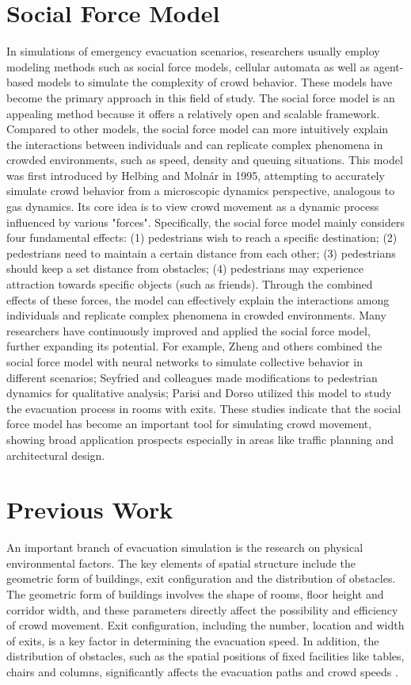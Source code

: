 \section{Social Force Model}
In simulations of emergency evacuation scenarios, researchers usually employ modeling methods such as social force models, cellular automata as well as agent-based models to simulate the complexity of crowd behavior. These models have become the primary approach in this field of study.
The social force model is an appealing method because it offers a relatively open and scalable framework. Compared to other models, the social force model can more intuitively explain the interactions between individuals and can replicate complex phenomena in crowded environments, such as speed, density and queuing situations. This model was first introduced by Helbing and Molnár in 1995, attempting to accurately simulate crowd behavior from a microscopic dynamics perspective, analogous to gas dynamics. Its core idea is to view crowd movement as a dynamic process influenced by various "forces".
Specifically, the social force model mainly considers four fundamental effects: (1) pedestrians wish to reach a specific destination; (2) pedestrians need to maintain a certain distance from each other; (3) pedestrians should keep a set distance from obstacles; (4) pedestrians may experience attraction towards specific objects (such as friends). Through the combined effects of these forces, the model can effectively explain the interactions among individuals and replicate complex phenomena in crowded environments.
Many researchers have continuously improved and applied the social force model, further expanding its potential. For example, Zheng and others combined the social force model with neural networks to simulate collective behavior in different scenarios; Seyfried and colleagues made modifications to pedestrian dynamics for qualitative analysis; Parisi and Dorso utilized this model to study the evacuation process in rooms with exits. These studies indicate that the social force model has become an important tool for simulating crowd movement, showing broad application prospects especially in areas like traffic planning and architectural design.

\section{Previous Work}
An important branch of evacuation simulation is the research on physical environmental factors. The key elements of spatial structure include the geometric form of buildings, exit configuration and the distribution of obstacles. The geometric form of buildings involves the shape of rooms, floor height and corridor width, and these parameters directly affect the possibility and efficiency of crowd movement. Exit configuration, including the number, location and width of exits, is a key factor in determining the evacuation speed. In addition, the distribution of obstacles, such as the spatial positions of fixed facilities like tables, chairs and columns, significantly affects the evacuation paths and crowd speeds .

